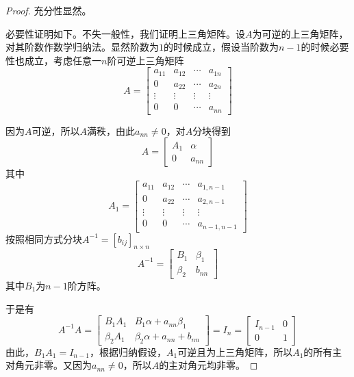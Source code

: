 \begin{proof}
    \label{proof-triangle-matrix-inversable}
    充分性显然。

    必要性证明如下。不失一般性，我们证明上三角矩阵。设$A$为可逆的上三角矩阵，对其阶数作数学归纳法。显然阶数为$1$的时候成立，假设当阶数为$n-1$的时候必要性也成立，考虑任意一$n$阶可逆上三角矩阵
    \[
        A=\begin{bmatrix}
            a_{11}  &   a_{12}  &   \cdots  &   a_{1n} \\
            0       &   a_{22}  &   \cdots  &   a_{2n} \\
            \vdots  &   \vdots  &   \vdots  &   \vdots \\
            0       &   0       &   \cdots  &   a_{nn}
        \end{bmatrix}
    \]
    
    因为$A$可逆，所以$A$满秩，由此$a_{nn}\neq0$，对$A$分块得到
    \[
        A=\begin{bmatrix}
            A_1&\alpha\\0&a_{nn}
        \end{bmatrix}
    \]
    其中
    \[
        A_1=\begin{bmatrix}
            a_{11}  &   a_{12}  &   \cdots  &   a_{1,n-1} \\
            0       &   a_{22}  &   \cdots  &   a_{2,n-1} \\
            \vdots  &   \vdots  &   \vdots  &   \vdots \\
            0       &   0       &   \cdots  &   a_{n-1,n-1}
        \end{bmatrix}
    \]
    按照相同方式分块$A^{-1}=[b_{ij}]_{n\times n}$
    \[
        A^{-1}=\begin{bmatrix}
            B_1&\beta_1\\\beta_2&b_{nn}
        \end{bmatrix}
    \]
    其中$B_1$为$n-1$阶方阵。

    于是有
    \[
        A^{-1}A=\begin{bmatrix}
            B_1A_1 & B_1\alpha+a_{nn}\beta_1 \\
            \beta_2A_1 & \beta_2\alpha+a_{nn}+b_{nn}
        \end{bmatrix}=I_n=\begin{bmatrix}
            I_{n-1} & 0 \\ 0 & 1
        \end{bmatrix}
    \]
    由此，$B_1A_1=I_{n-1}$，根据归纳假设，$A_1$可逆且为上三角矩阵，所以$A_1$的所有主对角元非零。又因为$a_{nn}\neq0$，所以$A$的主对角元均非零。
\end{proof}

